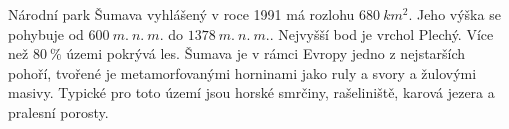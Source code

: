 Národní park Šumava vyhlášený v roce 1991 má rozlohu $\SI{680}{km^2}$. Jeho výška se pohybuje od $\SI{600}{m.\ n.\ m.}$ do $\SI{1378}{m.\ n.\ m.}$. Nejvyšší bod je vrchol Plechý. Více než $\SI{80}{\%}$ územi pokrývá les. Šumava je v rámci Evropy jedno z nejstarších pohoří, tvořené je metamorfovanými horninami jako ruly a svory a žulovými masivy. Typické pro toto území jsou horské smrčiny, rašeliniště, karová jezera a pralesní porosty.

